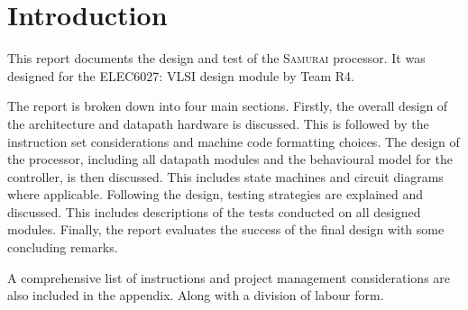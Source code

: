 

\chapter{Introduction}


This report documents the design and test of the \textsc{Samurai} processor. 
It was designed for the ELEC6027: VLSI design module by Team R4.

The report is broken down into four main sections.
Firstly, the overall design of the architecture and datapath hardware is discussed. 
This is followed by the instruction set considerations and machine code formatting choices. 
The design of the processor, including all datapath modules and the behavioural model for the controller, is then discussed.
This includes state machines and circuit diagrams where applicable. 
Following the design, testing strategies are explained and discussed. 
This includes descriptions of the tests conducted on all designed modules. 
Finally, the report evaluates the success of the final design with some concluding remarks. 

A comprehensive list of instructions and project management considerations are also included in the appendix.
Along with a division of labour form. 
